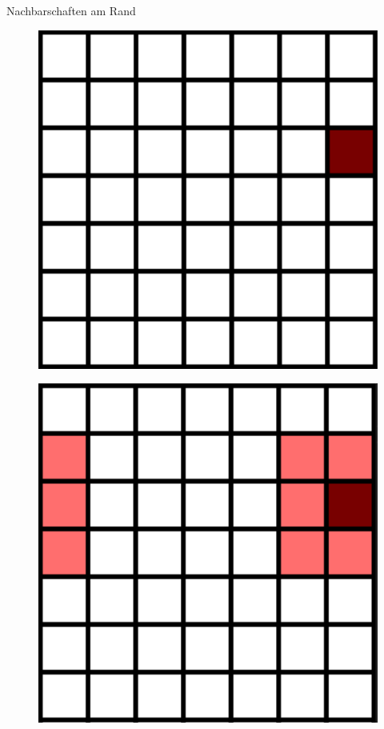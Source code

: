 \documentclass[aspectratio=169]{beamer}
\begin{document}
\begin{frame}{Nachbarschaften am Rand}
\begin{multicols*}{5}
      \begin{figure}[H]
        \centering
        \includegraphics[width = 0.25 \textheight]{neighborhood_border.png}
      \end{figure}

      \vfill\null



      \centering{\Huge $\rightarrow$ \par}
      \vfill\null

      \begin{figure}[H]
        \centering
        \includegraphics[width = 0.25 \textheight]{neighborhood_border_sol2.png}
      \end{figure}


\end{multicols*}
\end{frame}
\end{document}

